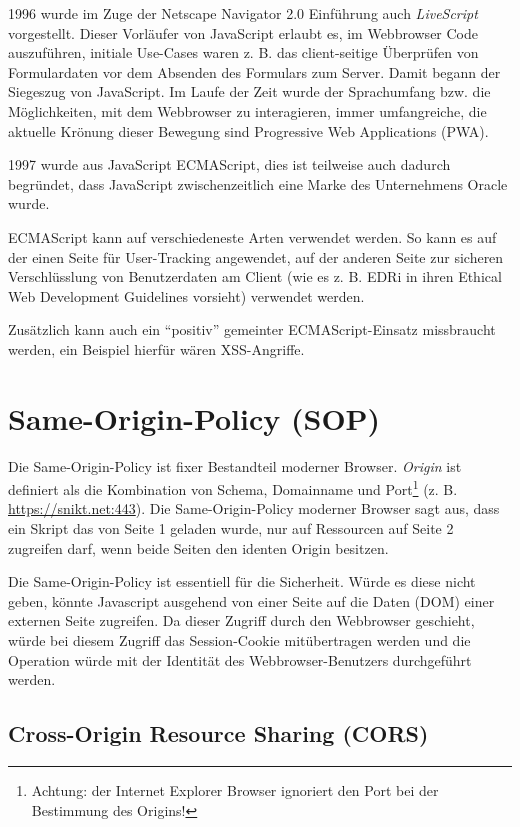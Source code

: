 1996 wurde im Zuge der Netscape Navigator 2.0 Einführung auch \textit{LiveScript} vorgestellt. Dieser Vorläufer von JavaScript erlaubt es, im Webbrowser Code auszuführen, initiale Use-Cases waren z. B. das client-seitige Überprüfen von Formulardaten vor dem Absenden des Formulars zum Server. Damit begann der Siegeszug von JavaScript. Im Laufe der Zeit wurde der Sprachumfang bzw. die Möglichkeiten, mit dem Webbrowser zu interagieren, immer umfangreiche, die aktuelle Krönung dieser Bewegung sind Progressive Web Applications (PWA).

1997 wurde aus JavaScript ECMAScript, dies ist teilweise auch dadurch begründet, dass JavaScript zwischenzeitlich eine Marke des Unternehmens Oracle wurde.

ECMAScript kann auf verschiedeneste Arten verwendet werden. So kann es auf der einen Seite für User-Tracking angewendet, auf der anderen Seite zur sicheren Verschlüsslung von Benutzerdaten am Client (wie es z. B. EDRi in ihren Ethical Web Development Guidelines vorsieht) verwendet werden.

Zusätzlich kann auch ein ``positiv'' gemeinter ECMAScript-Einsatz missbraucht werden, ein Beispiel hierfür wären XSS-Angriffe.

\section{Same-Origin-Policy (SOP)}

Die Same-Origin-Policy ist fixer Bestandteil moderner Browser. \textit{Origin} ist definiert als die Kombination von Schema, Domainname und Port\footnote{Achtung: der Internet Explorer Browser ignoriert den Port bei der Bestimmung des Origins!} (z. B. \url{https://snikt.net:443}). Die Same-Origin-Policy moderner Browser sagt aus, dass ein Skript das von Seite 1 geladen wurde, nur auf Ressourcen auf Seite 2 zugreifen darf, wenn beide Seiten den identen Origin besitzen.

Die Same-Origin-Policy ist essentiell für die Sicherheit. Würde es diese nicht geben, könnte Javascript ausgehend von einer Seite auf die Daten (DOM) einer externen Seite zugreifen. Da dieser Zugriff durch den Webbrowser geschieht, würde bei diesem Zugriff das Session-Cookie mitübertragen werden und die Operation würde mit der Identität des Webbrowser-Benutzers durchgeführt werden.

\subsection{Cross-Origin Resource Sharing (CORS)}

